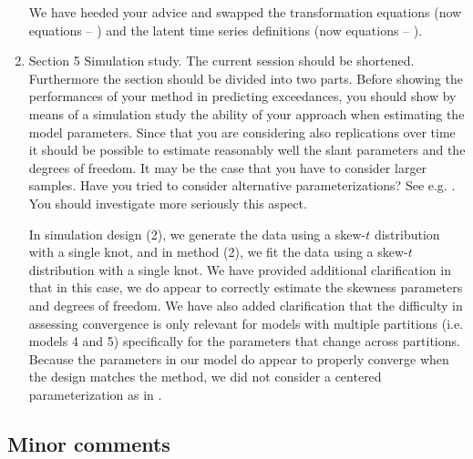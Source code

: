 \documentclass[11pt]{article}
\begin{document}
\begin{enumerate}[1.]
  \begin{response}
    We have heeded your advice and swapped the transformation equations (now equations  -- ) and the latent time series definitions (now equations  -- ).
  \end{response}

  \item Section 5 Simulation study. The current session should be shortened. Furthermore the section should be divided into two parts. Before showing the performances of your method in predicting exceedances, you should show by means of a simulation study the ability of your approach when estimating the model parameters. Since that you are considering also replications over time it should be possible to estimate reasonably well the slant parameters and the degrees of freedom. It may be the case that you have to consider larger samples. Have you tried to consider alternative parameterizations? See e.g. \citet{ArellanoValle2008}. You should investigate more seriously this aspect. \\

  \begin{response}
    In simulation design (2), we generate the data using a skew-$t$ distribution with a single knot, and in method (2), we fit the data using a skew-$t$ distribution with a single knot.
    We have provided additional clarification in  that in this case, we do appear to correctly estimate the skewness parameters and degrees of freedom.
    We have also added clarification that the difficulty in assessing convergence is only relevant for models with multiple partitions (i.e. models 4 and 5) specifically for the parameters that change across partitions.
    Because the parameters in our model do appear to properly converge when the design matches the method, we did not consider a centered parameterization as in \citet{ArellanoValle2008}.
  \end{response}

\end{enumerate}

\subsection*{Minor comments}
\end{document}
